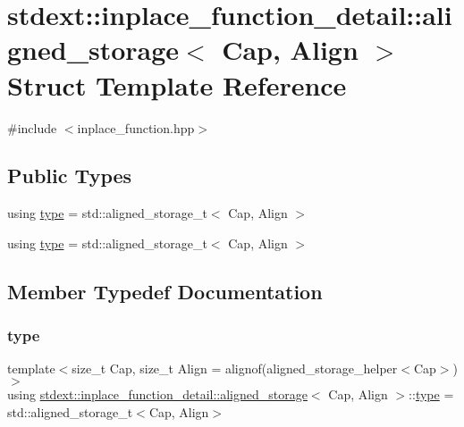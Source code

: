 \hypertarget{structstdext_1_1inplace__function__detail_1_1aligned__storage}{}\section{stdext\+:\+:inplace\+\_\+function\+\_\+detail\+:\+:aligned\+\_\+storage$<$ Cap, Align $>$ Struct Template Reference}
\label{structstdext_1_1inplace__function__detail_1_1aligned__storage}


{\ttfamily \#include $<$inplace\+\_\+function.\+hpp$>$}

\subsection*{Public Types}
\begin{DoxyCompactItemize}
\item 
using \hyperlink{structstdext_1_1inplace__function__detail_1_1aligned__storage_a2715429b3ff736ab58dea08f28f06947}{type} = std\+::aligned\+\_\+storage\+\_\+t$<$ Cap, Align $>$
\item 
using \hyperlink{structstdext_1_1inplace__function__detail_1_1aligned__storage_a2715429b3ff736ab58dea08f28f06947}{type} = std\+::aligned\+\_\+storage\+\_\+t$<$ Cap, Align $>$
\end{DoxyCompactItemize}


\subsection{Member Typedef Documentation}
\mbox{\label{structstdext_1_1inplace__function__detail_1_1aligned__storage_a2715429b3ff736ab58dea08f28f06947}} 
\subsubsection{\texorpdfstring{type}{type}\hspace{0.1cm}{\footnotesize\ttfamily [1/2]}}
{\footnotesize\ttfamily template$<$size\+\_\+t Cap, size\+\_\+t Align = alignof(aligned\+\_\+storage\+\_\+helper$<$\+Cap$>$)$>$ \\
using \hyperlink{structstdext_1_1inplace__function__detail_1_1aligned__storage}{stdext\+::inplace\+\_\+function\+\_\+detail\+::aligned\+\_\+storage}$<$ Cap, Align $>$\+::\hyperlink{structstdext_1_1inplace__function__detail_1_1aligned__storage_a2715429b3ff736ab58dea08f28f06947}{type} =  std\+::aligned\+\_\+storage\+\_\+t$<$Cap, Align$>$}

